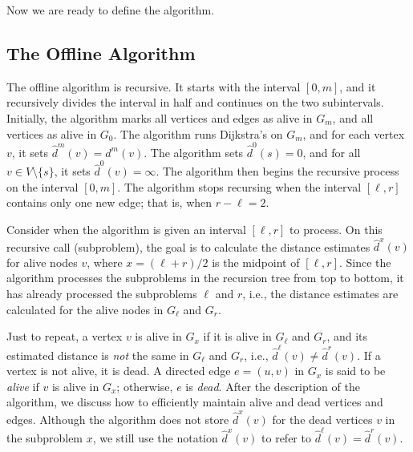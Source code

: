 Now we are ready to define the algorithm.

\subsection{The Offline Algorithm}
\label{sec:offline_algorithm}

The offline algorithm is recursive.
It starts with the interval $[0,m]$, and it recursively divides the interval in half and continues on the two subintervals.
Initially, the algorithm marks all vertices and edges as alive in $G_m$, and all vertices as alive in $G_0$. The algorithm runs  Dijkstra's  on $G_m$, and for each vertex $v$, it sets $\hat{d}^m(v) = d^m(v)$. The algorithm sets $\hat{d}^0(s) = 0$, and for all $v \in V \setminus \{s\}$, it sets $\hat{d}^0(v) = \infty$.  The algorithm then begins the recursive process on the interval $[0, m]$.
The algorithm stops recursing when the interval $[\ell,r]$ contains only one new edge; that is, when $r-\ell=2$.

Consider when the algorithm is given an interval $[\ell, r]$ to process. 
On this recursive call (subproblem), the goal is to calculate the distance estimates $\hat{d}^x(v)$ for alive nodes $v$, where $x = (\ell + r)/2$ is the midpoint of $[\ell,r]$.
Since the algorithm processes the subproblems in the recursion tree from top to bottom, it has already processed the subproblems $\ell$ and $r$, i.e., the distance estimates are calculated for the alive nodes in $G_\ell$ and $G_r$.

Just to repeat, a vertex $v$ is alive in $G_x$ if it is alive in $G_\ell$ and $G_r$, and its estimated distance is \emph{not} the same in $G_\ell$ and $G_r$, i.e., $\hat{d}^\ell(v) \neq \hat{d}^r(v)$. If a vertex is not alive, it is dead.   
A directed edge $e = (u,v)$ in $G_x$ is said to be \emph{alive} if $v$ is alive in $G_x$; otherwise, $e$ is \emph{dead}. After the description of the algorithm, we discuss how to efficiently maintain alive and dead vertices and edges. 
Although the algorithm does not store $\hat{d}^x(v)$ for the dead vertices $v$ in the subproblem $x$, we still use the notation $\hat{d}^x(v)$ to refer to $\hat{d}^\ell(v) = \hat{d}^r(v)$.

